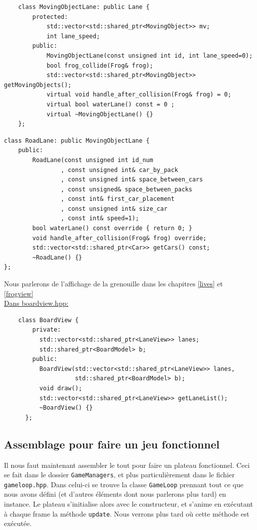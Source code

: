 \documentclass[a4paper, 12pt]{article}
\begin{document}
\begin{lstlisting}
    class MovingObjectLane: public Lane {
        protected:
            std::vector<std::shared_ptr<MovingObject>> mv;
            int lane_speed;
        public:
            MovingObjectLane(const unsigned int id, int lane_speed=0);
            bool frog_collide(Frog& frog);
            std::vector<std::shared_ptr<MovingObject>> getMovingObjects();
            virtual void handle_after_collision(Frog& frog) = 0;
            virtual bool waterLane() const = 0 ;
            virtual ~MovingObjectLane() {}
    };   
\end{lstlisting}

\begin{lstlisting}
class RoadLane: public MovingObjectLane {
    public:
        RoadLane(const unsigned int id_num
                , const unsigned int& car_by_pack
                , const unsigned int& space_between_cars
                , const unsigned& space_between_packs
                , const int& first_car_placement
                , const unsigned int& size_car
                , const int& speed=1);
        bool waterLane() const override { return 0; }
        void handle_after_collision(Frog& frog) override;
        std::vector<std::shared_ptr<Car>> getCars() const;
        ~RoadLane() {}
};
\end{lstlisting}

Nous parlerons de l'affichage de la grenouille dans les chapitres \ref{lives} et \ref{frogview} \\

\underline{Dans boardview.hpp:} \hspace{0.5cm}

\begin{lstlisting}
    class BoardView {
        private:
          std::vector<std::shared_ptr<LaneView>> lanes;
          std::shared_ptr<BoardModel> b;
        public:
          BoardView(std::vector<std::shared_ptr<LaneView>> lanes,
                    std::shared_ptr<BoardModel> b);
          void draw();
          std::vector<std::shared_ptr<LaneView>> getLaneList();
          ~BoardView() {}
      };
\end{lstlisting}


\subsection{Assemblage pour faire un jeu fonctionnel}

Il nous faut maintenant assembler le tout pour faire un plateau fonctionnel. Ceci se fait dans le dossier \texttt{GameManagers}, et plus particulièrement dans le fichier \texttt{gameloop.hpp}. Dans celui-ci se trouve la classe \texttt{GameLoop} prennant tout ce que nous avons défini (et d'autres éléments dont nous parlerons plus tard) en instance. Le plateau s'initialise alors avec le constructeur, et s'anime en exécutant à chaque frame la méthode \texttt{update}. Nous verrons plus tard où cette méthode est exécutée.
\end{document}
